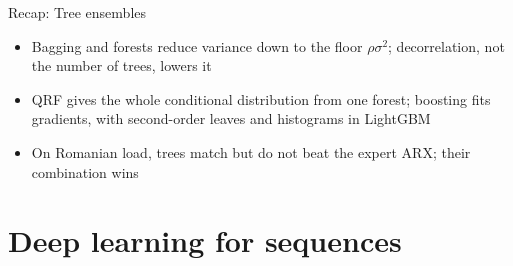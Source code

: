 \begin{frame}{Recap: Tree ensembles}
\itemsize{\small}
\begin{itemize}
    \item Bagging and forests reduce variance down to the floor $\rho\sigma^2$; decorrelation, not the number of trees, lowers it
    \item QRF gives the whole conditional distribution from one forest; boosting fits gradients, with second-order leaves and histograms in LightGBM
    \item On Romanian load, trees match but do not beat the expert ARX; their combination wins
\end{itemize}
\end{frame}


\section{Deep learning for sequences}

